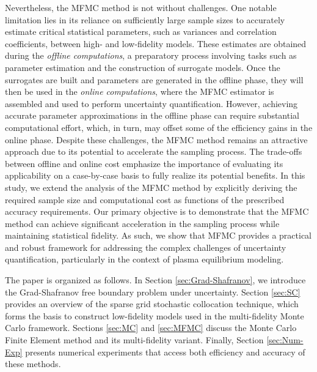 Nevertheless, the MFMC method is not without challenges. One notable limitation lies in its reliance on sufficiently large sample sizes to accurately estimate critical statistical parameters, such as variances and correlation coefficients, between high- and low-fidelity models. These estimates are obtained during the \textit{offline computations}, a preparatory process involving tasks such as parameter estimation and the construction of surrogate models. Once the surrogates are built and parameters are generated in the offline phase, they will then be used in the \textit{online computations}, where the MFMC estimator is assembled and used to perform uncertainty quantification. However, achieving accurate parameter approximations in the offline phase can require substantial computational effort, which, in turn, may offset some of the efficiency gains in the online phase. Despite these challenges, the MFMC method remains an attractive approach due to its potential to accelerate the sampling process. The trade-offs between offline and online cost emphasize the importance of evaluating its applicability on a case-by-case basis to fully realize its potential benefits. In this study, we extend the analysis of the MFMC method \cite{PeWiGu:2016} by explicitly deriving the required sample size and computational cost as functions of the prescribed accuracy requirements. Our primary objective is to demonstrate that the MFMC method can achieve significant acceleration in the sampling process while maintaining statistical fidelity. As such, we show that MFMC provides a practical and robust framework for addressing the complex challenges of uncertainty quantification, particularly in the context of plasma equilibrium modeling.


 
The paper is organized as follows. In Section \ref{sec:Grad-Shafranov}, we introduce the Grad-Shafranov free boundary problem under uncertainty. Section \ref{sec:SC} provides an overview of the sparse grid stochastic collocation technique, which forms the basis to construct low-fidelity models used in the multi-fidelity Monte Carlo framework. Sections \ref{sec:MC} and \ref{sec:MFMC} discuss the Monte Carlo Finite Element method and its multi-fidelity variant. Finally, Section \ref{sec:Num-Exp} presents numerical experiments that access both efficiency and accuracy of these methods.



